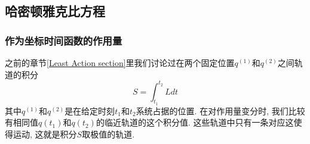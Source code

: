 \documentclass[a4paper,11pt]{book}
\begin{document}
\subsection{哈密顿雅克比方程}
\subsubsection*{作为坐标时间函数的作用量}
之前的章节\ref{Least Action section}里我们讨论过在两个固定位置$q^{(1)}$和$q^{(2)}$之间轨道的积分
\begin{equation}\label{Action L}
  S=\int_{t_1}^{t_2}Ldt
\end{equation}
其中$q^{(1)}$和$q^{(2)}$是在给定时刻$t_1$和$t_2$系统占据的位置. 在对作用量变分时, 我们比较有相同值$q(t_1)$和$q(t_2)$的临近轨道的这个积分值. 这些轨道中只有一条对应这使得运动, 这就是积分$S$取极值的轨道.
\end{document}
